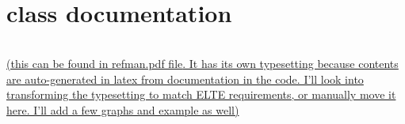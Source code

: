 \documentclass{elteikthesis}[2018/06/06]
\begin{document}
\section{class documentation}
\label{sec-3-4}
\begin{center}
\begin{tabular}{}
\\
\\
\end{tabular}
\end{center}
\uline{(this can be found in \href{latex/refman.pdf}{refman.pdf file}. It has its own typesetting because contents are auto-generated in latex from documentation in the code. I'll look into transforming the typesetting to match ELTE requirements, or manually move it here. I'll add a few graphs and example as well)} \\
\begin{center}
\begin{tabular}{}
\\
\\
\end{tabular}
\end{center}
\end{document}
